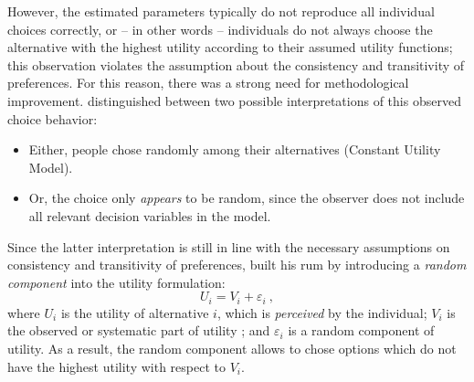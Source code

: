 However, the estimated parameters typically do not reproduce all individual choices correctly, or -- in other words -- individuals do not always choose the alternative with the highest utility according to their assumed utility functions; this observation violates the assumption about the consistency and transitivity of preferences. For this reason, there was a strong need for methodological improvement.
%
\citet{Luce1965PreferenceUtility} distinguished between two possible interpretations of this observed choice behavior:
%
\begin{itemize}\styleItemize
\item Either, people chose randomly among their alternatives (Constant Utility Model).
%
\item Or, the choice only \emph{appears} to be random, since the observer does not include all relevant decision variables in the model.
\end{itemize}
%
Since the latter interpretation is still in line with the necessary assumptions on consistency and transitivity of preferences, \citet{McFadden1975DiscreteChoiceModel} built his \gls{rum} by introducing a \emph{random component} into the utility formulation:
%
\begin{equation}
U_i = V_i + \varepsilon_i \ ,
\end{equation}
%
where $U_i$ is the utility of alternative $i$, which is \emph{perceived} by the individual; $V_i$ is the observed or systematic part of utility%
%
%
%
; and $\varepsilon_i$ is a random component of utility.
%
As a result, the random component allows to chose options which do not have the highest utility with respect to $V_i$.
%

